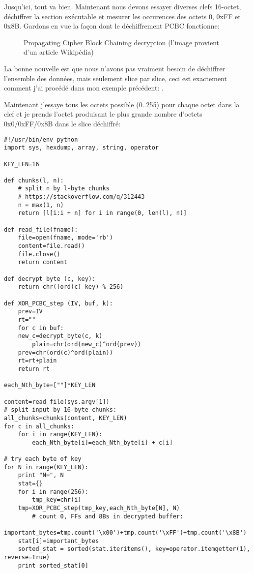 Jusqu'ici, tout va bien. Maintenant nous devons essayer diverses clefs 16-octet, déchiffrer
la section exécutable et mesurer les occurences des octets 0, 0xFF et 0x8B.
Gardons en vue la façon dont le déchiffrement PCBC fonctionne:

\begin{figure}[H]
\centering
{}
\caption{Propagating Cipher Block Chaining decryption (l'image provient d'un article Wikipédia)}
\end{figure}

La bonne nouvelle est que nous n'avons pas vraiment besoin de déchiffrer l'ensemble
des données, mais seulement slice par slice, ceci est exactement comment j'ai procédé
dans mon exemple précédent: .

Maintenant j'essaye tous les octets possible (0..255) pour chaque octet dans la clef
et je prends l'octet produisant le plus grande nombre d'octets 0x0/0xFF/0x8B dans le slice
déchiffré:

\begin{lstlisting}[style=custompy]
#!/usr/bin/env python
import sys, hexdump, array, string, operator

KEY_LEN=16

def chunks(l, n):
    # split n by l-byte chunks
    # https://stackoverflow.com/q/312443
    n = max(1, n)
    return [l[i:i + n] for i in range(0, len(l), n)]

def read_file(fname):
    file=open(fname, mode='rb')
    content=file.read()
    file.close()
    return content

def decrypt_byte (c, key):
    return chr((ord(c)-key) % 256)

def XOR_PCBC_step (IV, buf, k):
    prev=IV
    rt=""
    for c in buf:
	new_c=decrypt_byte(c, k)
        plain=chr(ord(new_c)^ord(prev))
	prev=chr(ord(c)^ord(plain))
	rt=rt+plain
    return rt

each_Nth_byte=[""]*KEY_LEN

content=read_file(sys.argv[1])
# split input by 16-byte chunks:
all_chunks=chunks(content, KEY_LEN)
for c in all_chunks:
    for i in range(KEY_LEN):
        each_Nth_byte[i]=each_Nth_byte[i] + c[i]

# try each byte of key
for N in range(KEY_LEN):
    print "N=", N
    stat={}
    for i in range(256):
        tmp_key=chr(i)
	tmp=XOR_PCBC_step(tmp_key,each_Nth_byte[N], N)
        # count 0, FFs and 8Bs in decrypted buffer:
	important_bytes=tmp.count('\x00')+tmp.count('\xFF')+tmp.count('\x8B')
	stat[i]=important_bytes
    sorted_stat = sorted(stat.iteritems(), key=operator.itemgetter(1), reverse=True)
    print sorted_stat[0]
\end{lstlisting}

